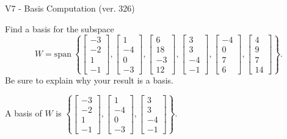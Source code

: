 \begin{exercise}
  \begin{exerciseTitle}V7 - Basis Computation (ver. 326)\end{exerciseTitle}
  \begin{exerciseStatement}
    Find a basis for the subspace 
\[W=\mathrm{span}\ \left\{\left[\begin{array}{r}
-3 \\
-2 \\
1 \\
-1
\end{array}\right] , \left[\begin{array}{r}
1 \\
-4 \\
0 \\
-3
\end{array}\right] , \left[\begin{array}{r}
6 \\
18 \\
-3 \\
12
\end{array}\right] , \left[\begin{array}{r}
3 \\
3 \\
-4 \\
-1
\end{array}\right] , \left[\begin{array}{r}
-4 \\
0 \\
7 \\
6
\end{array}\right] , \left[\begin{array}{r}
4 \\
9 \\
7 \\
14
\end{array}\right]\right\}.\]
 Be sure to explain why your result is a basis.


  \end{exerciseStatement}
  \begin{exerciseAnswer}
   A basis of \(W\) is  \(\left\{\left[\begin{array}{r}
-3 \\
-2 \\
1 \\
-1
\end{array}\right] , \left[\begin{array}{r}
1 \\
-4 \\
0 \\
-3
\end{array}\right] , \left[\begin{array}{r}
3 \\
3 \\
-4 \\
-1
\end{array}\right]\right\}\).
  


  \end{exerciseAnswer}
\end{exercise}